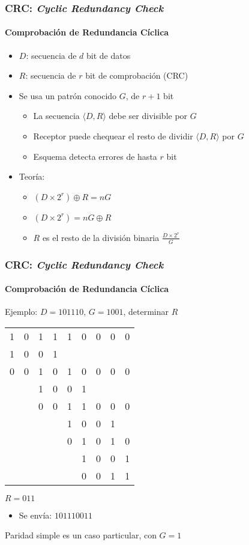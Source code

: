 \documentclass[letter]{beamer}
\begin{document}
\begin{frame}
  \frametitle{CRC: {\em Cyclic Redundancy Check}}
  \framesubtitle{Comprobación de Redundancia Cíclica}

  \begin{itemize}
    \item $D$: secuencia de $d$ bit de datos
    \item $R$: secuencia de $r$ bit de comprobación (CRC)
    \item Se usa un patrón conocido $G$, de $r+1$ bit
    \begin{itemize}
      \item La secuencia $\langle D,R \rangle$ debe ser divisible por $G$
      \item Receptor puede chequear el resto de dividir $\langle D,R \rangle$ por $G$
      \item Esquema detecta errores de hasta $r$ bit
    \end{itemize}
    \item Teoría: 
      \begin{itemize}
        \item $(D\times 2^r) \oplus R = nG$
        \item $(D\times 2^r) = nG \oplus R$
        \item $R$ es el resto de la división binaria $\frac{D \times 2^r}{G}$
      \end{itemize}
  \end{itemize}
  
\end{frame}

\begin{frame}
  \frametitle{CRC: {\em Cyclic Redundancy Check}}
  \framesubtitle{Comprobación de Redundancia Cíclica}

  Ejemplo: $D=101110$, $G=1001$, determinar $R$
  
  \begin{tabular}{ccccccccc}
    1 & 0 & 1 & 1 & 1 & 0 & 0 & 0 & 0 \\
    1 & 0 & 0 & 1 &   &   &   &   &   \\ \hline
    0 & 0 & 1 & 0 & 1 & 0 & 0 & 0 & 0 \\
      &   & 1 & 0 & 0 & 1 &   &   &   \\ \hline
      &   & 0 & 0 & 1 & 1 & 0 & 0 & 0 \\
      &   &   &   & 1 & 0 & 0 & 1 &   \\ \hline
      &   &   &   & 0 & 1 & 0 & 1 & 0 \\
      &   &   &   &   & 1 & 0 & 0 & 1 \\ \hline
      &   &   &   &   & 0 & 0 & 1 & 1 \\ \hline
  \end{tabular}
  $R = 011$
  \begin{itemize}
    \item Se envía: $101110011$
  \end{itemize}
  Paridad simple es un caso particular, con $G=1$
\end{frame}
\end{document}
